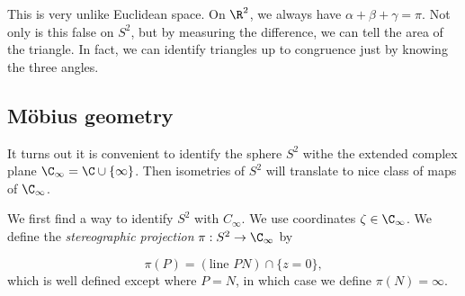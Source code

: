 \documentclass[a4paper]{article}
\begin{document}
This is very unlike Euclidean space. On $\R^2$, we always have $\alpha + \beta + \gamma = \pi$. Not only is this false on $S^2$, but by measuring the difference, we can tell the area of the triangle. In fact, we can identify triangles up to congruence just by knowing the three angles.

\subsection{M\texorpdfstring{\"o}{o}bius geometry}
It turns out it is convenient to identify the sphere $S^2$ withe the extended complex plane $\C_\infty = \C \cup \{\infty\}$. Then isometries of $S^2$ will translate to nice class of maps of $\C_\infty$.

We first find a way to identify $S^2$ with $C_\infty$. We use coordinates $\zeta \in \C_\infty$. We define the \emph{stereographic projection} $\pi: S^2 \to \C_\infty$ by
\begin{center}
\end{center}
\[
  \pi(P) = (\text{line } PN)\cap \{z = 0\},
\]
which is well defined except where $P = N$, in which case we define $\pi(N) = \infty$.
\end{document}
